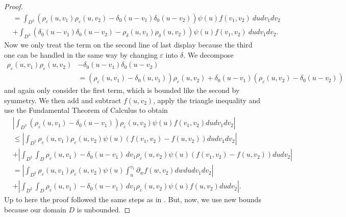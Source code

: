 \documentclass[a4paper, reqno, 12pt]{amsart}
\theoremstyle{plain}
\theoremstyle{definition}
\begin{document}
\begin{proof}
\begin{equation}
\begin{split}
        & = \int_{D^3} \left( \rho_{\varepsilon}(u,v_1)\rho_{\varepsilon}(u, v_2) - \delta_0(u-v_1)\delta_0(u-v_2)\right) \psi(u)f(v_1,v_2) \ du dv_1 dv_2 \\
        &+ \int_{D^3}   \left( \delta_0(u-v_1)\delta_0(u-v_2)- \rho_\delta (u,v_1)\rho_\delta (u, v_2)\right) \psi(u)f(v_1,v_2) \ du dv_1 dv_2.
      \end{split} 
    \end{equation}
 Now we only treat the term on the second line of last display  because the third one can be handled in the same way by changing $\varepsilon$ into $\delta$. We decompose
    \begin{align*}
        \rho_{\varepsilon}(u,v_1)\rho_{\varepsilon}(u,v_2)& - \delta_0(u-v_1)\delta_0(u-v_2)\\
        &= (\rho_{\varepsilon}(u,v_1) -\delta_0(u,v_1))\rho_{\varepsilon}(u,v_2) + \delta_0(u-v_1)(\rho_{\varepsilon}(u,v_2) - \delta_0(u-v_2))
    \end{align*}
    and again only consider the first term, which is bounded like the second by symmetry. We then add and subtract $f(u,v_2)$, apply the triangle inequality and use the Fundamental Theorem of Calculus to obtain
    \begin{align}
        &\left| \int_{D^3} (\rho_{\varepsilon}(u,v_1) -\delta_0(u-v_1))\rho_{\varepsilon}(u,v_2)\psi(u) f(v_1,v_2) du dv_1 dv_2 \right| \nonumber\\
        & \leq \left| \int_{D^3} \rho_{\varepsilon}(u,v_1)\rho_{\varepsilon}(u,v_2)\psi(u) (f(v_1,v_2) - f(u,v_2)) dudv_1dv_2 \right| \nonumber \\
        & + \left| \int_{D^2} \int_{D} \rho_{\varepsilon}(u,v_1) -\delta_0(u-v_1) \, dv_1 \rho_{\varepsilon}(u,v_2)\psi(u) (f(v_1,v_2) - f(u,v_2)) dudv_2 \right| \nonumber \\
        & = \left| \int_{D^3} \rho_{\varepsilon}(u,v_1)\rho_{\varepsilon}(u,v_2)\psi(u) \int_u^{v_1} \partial_w f(w,v_2) dw dudv_1dv_2 \right| \label{eq:firstterm37} \\
        & + \left| \int_{D^2} \int_{D} \rho_{\varepsilon}(u,v_1) -\delta_0(u-v_1) \, dv_1 \rho_{\varepsilon}(u,v_2)\psi(u)  f(u,v_2) dudv_2 \right|  \label{eq:secondterm38}.
    \end{align}
 Up to here the proof followed the same steps as in \cite{GPS20}. But, now, we use new bounds because our domain $D$ is unbounded.


\end{proof}
\end{document}
